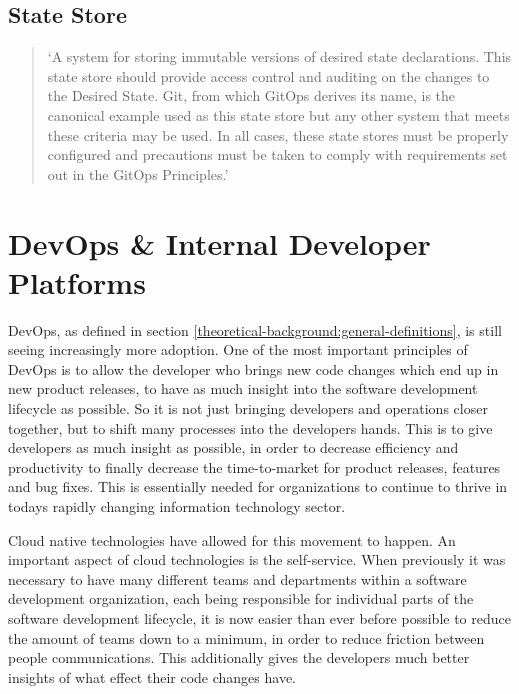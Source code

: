 \subsection*{State Store}
\begin{quotation}
\noindent
\enquote*{A system for storing immutable versions of desired state declarations. This state store should provide access control and auditing on the changes to the Desired State. Git, from which GitOps derives its name, is the canonical example used as this state store but any other system that meets these criteria may be used. In all cases, these state stores must be properly configured and precautions must be taken to comply with requirements set out in the GitOps Principles.}
\autocite{gitopsGlossary}
\end{quotation}













\section{DevOps \& Internal Developer Platforms}

DevOps, as defined in section \ref{theoretical-background:general-definitions},
is still seeing increasingly more adoption.
One of the most important principles of DevOps is
to allow the developer who brings new code changes
which end up in new product releases,
to have as much insight into the software development lifecycle as possible.
So it is not just bringing developers and operations closer together,
but to shift many processes into the developers hands.
This is to give developers as much insight as possible,
in order to decrease efficiency and productivity to finally
decrease the time-to-market for product releases, features and bug fixes.
This is essentially needed for organizations to continue to thrive in todays
rapidly changing information technology sector.

Cloud native technologies have allowed for this movement to happen.
An important aspect of cloud technologies is the self-service.
When previously it was necessary to have many different teams and departments
within a software development organization,
each being responsible for individual parts of the 
software development lifecycle,
it is now easier than ever before possible to reduce the amount of
teams down to a minimum, in order to reduce friction between people communications.
This additionally gives the developers much better insights of what effect their code changes have.

